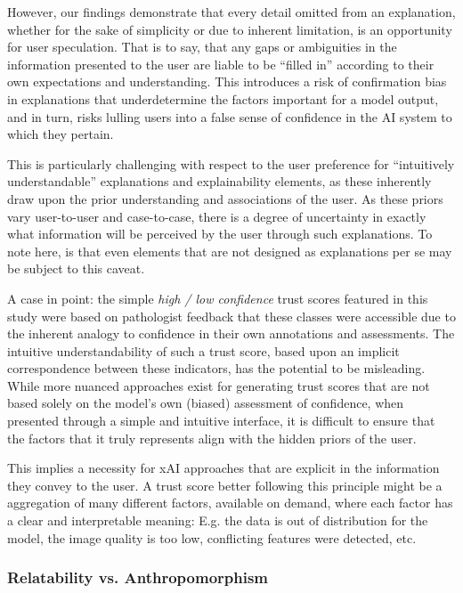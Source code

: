 \documentclass[final,5p,times,twocolumn,hyphens]{elsarticle}
\begin{document}
However, our findings demonstrate that every detail omitted from an explanation, whether for the sake of simplicity or due to inherent limitation, is an opportunity for user speculation. That is to say, that any gaps or ambiguities in the information presented to the user are liable to be ``filled in'' according to their own expectations and understanding. This introduces a risk of confirmation bias in explanations that underdetermine the factors important for a model output, and in turn, risks lulling users into a false sense of confidence in the AI system to which they pertain.

This is particularly challenging with respect to the user preference for ``intuitively understandable'' explanations and explainability elements, as these inherently draw upon the prior understanding and associations of the user. As these priors vary user-to-user and case-to-case, there is a degree of uncertainty in exactly what information will be perceived by the user through such explanations. To note here, is that even elements that are not designed as explanations per se may be subject to this caveat.

A case in point: the simple \textit{high / low confidence} trust scores featured in this study were based on pathologist feedback that these classes were accessible due to the inherent analogy to confidence in their own annotations and assessments. The intuitive understandability of such a trust score, based upon an implicit correspondence between these indicators, has the potential to be misleading. While more nuanced approaches exist for generating trust scores that are not based solely on the model's own (biased) assessment of confidence, when presented through a simple and intuitive interface, it is difficult to ensure that the factors that it truly represents align with the hidden priors of the user.

This implies a necessity for xAI approaches that are explicit in the information they convey to the user. A trust score better following this principle might be a aggregation of many different factors, available on demand, where each factor has a clear and interpretable meaning: E.g. the data is out of distribution for the model, the image quality is too low, conflicting features were detected, etc.

\subsubsection{Relatability vs. Anthropomorphism}
\end{document}
